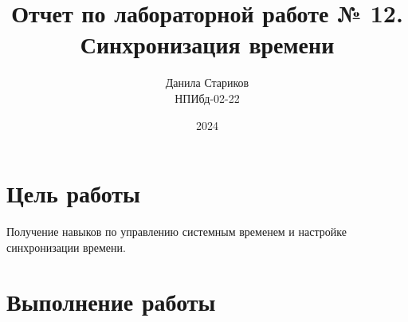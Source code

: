

\title{Отчет по лабораторной работе № 12. \\ Синхронизация времени}
\author{Данила Стариков \\ НПИбд-02-22}
\date{2024}



\maketitle
\newpage

\tableofcontents

\newpage
\section{Цель работы}
Получение навыков по управлению системным временем и настройке синхронизации времени.

\newpage
\section{Выполнение работы}
